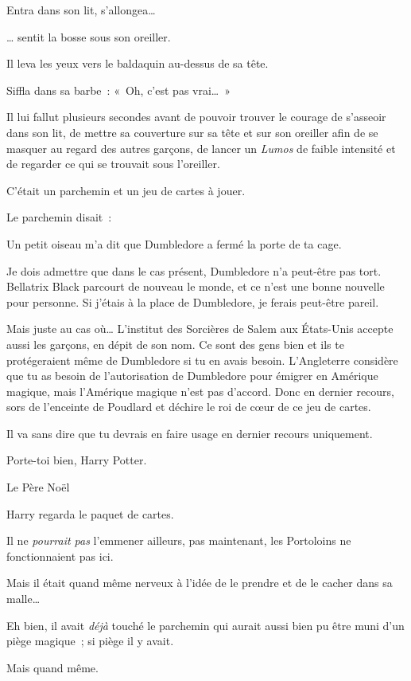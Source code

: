 Entra dans son lit, s'allongea…

… sentit la bosse sous son oreiller.

Il leva les yeux vers le baldaquin au-dessus de sa tête.

Siffla dans sa barbe~: «~Oh, c'est pas vrai…~»

Il lui fallut plusieurs secondes avant de pouvoir trouver le courage de s'asseoir dans son lit, de mettre sa couverture sur sa tête et sur son oreiller afin de se masquer au regard des autres garçons, de lancer un \emph{Lumos} de faible intensité et de regarder ce qui se trouvait sous l'oreiller.

C'était un parchemin et un jeu de cartes à jouer.

Le parchemin disait~:

\begin{writtenNote}
Un petit oiseau m'a dit que Dumbledore a fermé la porte de ta cage.

Je dois admettre que dans le cas présent, Dumbledore n'a peut-être pas tort. Bellatrix Black parcourt de nouveau le monde, et ce n'est une bonne nouvelle pour personne. Si j'étais à la place de Dumbledore, je ferais peut-être pareil.

Mais juste au cas où… L'institut des Sorcières de Salem aux États-Unis accepte aussi les garçons, en dépit de son nom. Ce sont des gens bien et ils te protégeraient même de Dumbledore si tu en avais besoin. L'Angleterre considère que tu as besoin de l'autorisation de Dumbledore pour émigrer en Amérique magique, mais l'Amérique magique n'est pas d'accord. Donc en dernier recours, sors de l'enceinte de Poudlard et déchire le roi de cœur de ce jeu de cartes.

Il va sans dire que tu devrais en faire usage en dernier recours uniquement.

Porte-toi bien, Harry Potter.

Le Père Noël
\end{writtenNote}

Harry regarda le paquet de cartes.

Il ne \emph{pourrait pas} l'emmener ailleurs, pas maintenant, les Portoloins ne fonctionnaient pas ici.

Mais il était quand même nerveux à l'idée de le prendre et de le cacher dans sa malle…

Eh bien, il avait \emph{déjà} touché le parchemin qui aurait aussi bien pu être muni d'un piège magique~; si piège il y avait.

Mais quand même.

